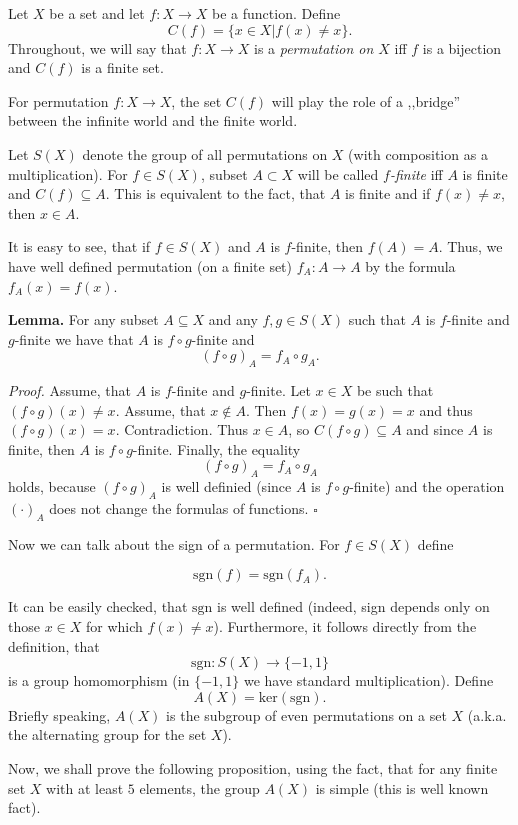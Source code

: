 \documentclass[12pt]{article}
\begin{document}
Let $X$ be a set and let $f:X\to X$ be a function. Define
$$C(f)=\{x\in X | f(x)\neq x\}.$$
Throughout, we will say that $f:X\to X$ is a \textit{permutation on $X$} iff
$f$ is a bijection and $C(f)$ is a finite set.

For permutation $f:X\to X$, the set $C(f)$ will play the role of a ,,bridge'' between the infinite world and the finite world.

Let $S(X)$ denote the group of all permutations on $X$ (with composition as a multiplication). For $f\in S(X)$, subset $A\subset X$ will be called \textit{$f$-finite} iff $A$ is finite and $C(f)\subseteq A$. This is equivalent to the fact, that $A$ is finite and if $f(x)\neq x$, then $x\in A$.

It is easy to see, that if $f\in S(X)$ and $A$ is $f$-finite, then $f(A)=A$. Thus, we have well defined permutation (on a finite set) $f_A:A\to A$ by the formula $f_A(x)=f(x)$.

\textbf{Lemma.} For any subset $A\subseteq X$ and any $f,g\in S(X)$ such that $A$ is $f$-finite and $g$-finite we have that $A$ is $f\circ g$-finite and 
$$(f\circ g)_A=f_A\circ g_A.$$

\textit{Proof.} Assume, that $A$ is $f$-finite and $g$-finite. Let $x\in X$ be such that $(f\circ g)(x)\neq x$. Assume, that $x\not\in A$. Then $f(x)=g(x)=x$ and thus $(f\circ g)(x)=x$. Contradiction. Thus $x\in A$, so $C(f\circ g)\subseteq A$ and since $A$ is finite, then $A$ is $f\circ g$-finite. Finally, the equality
$$(f\circ g)_A=f_A\circ g_A$$
holds, because $(f\circ g)_A$ is well definied (since $A$ is $f\circ g$-finite) and the operation $(\cdot)_A$ does not change the formulas of functions. $\square$

Now we can talk about the sign of a permutation. For $f\in S(X)$ define

$$\mathrm{sgn}(f)=\mathrm{sgn}(f_A).$$

It can be easily checked, that $\mathrm{sgn}$ is well defined (indeed, sign depends only on those $x\in X$ for which $f(x)\neq x$). Furthermore, it follows directly from the definition, that
$$\mathrm{sgn}:S(X)\to \{-1,1\}$$
is a group homomorphism (in $\{-1,1\}$ we have standard multiplication). Define
$$A(X)=\mathrm{ker}(\mathrm{sgn}).$$
Briefly speaking, $A(X)$ is the subgroup of even permutations on a set $X$ (a.k.a. the alternating group for the set $X$).

Now, we shall prove the following proposition, using the fact, that for any finite set $X$ with at least $5$ elements, the group $A(X)$ is simple (this is well known fact).
\end{document}
